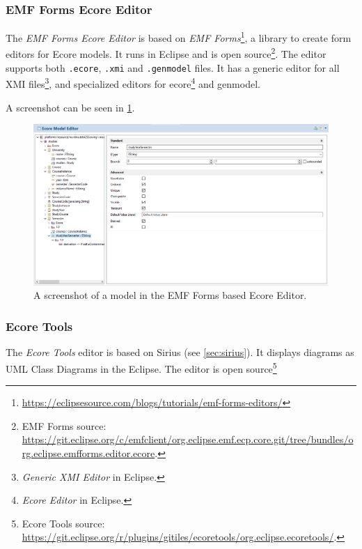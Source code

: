 \subsubsection{EMF Forms Ecore Editor} %
The \emph{EMF Forms Ecore Editor} is based on \emph{EMF Forms}\footnote{\href{https://eclipsesource.com/blogs/tutorials/emf-forms-editors/}{https://eclipsesource.com/blogs/tutorials/emf-forms-editors/}}, a library to create form editors for \gls{Ecore} models.
It runs in \gls{Eclipse} and is \gls{open source}\footnote{EMF Forms source: \href{https://git.eclipse.org/c/emfclient/org.eclipse.emf.ecp.core.git/tree/bundles/org.eclipse.emfforms.editor.ecore}{https://git.eclipse.org/c/emfclient/org.eclipse.emf.ecp.core.git/tree/bundles/org.eclipse.emfforms.editor.ecore}.}.
The editor supports both \texttt{.ecore}, \texttt{.xmi} and \texttt{.genmodel} files.
It has a generic editor for all \gls{XMI} files\footnote{\emph{Generic XMI Editor} in \gls{Eclipse}.}, and specialized editors for ecore\footnote{\emph{Ecore Editor} in \gls{Eclipse}.} and genmodel.~\cite{eclipsesourceEMFFormsEditors2016}

A screenshot can be seen in \cref{fig:emf-forms-ecore-editor}.

\begin{figure}[htbp]  %
  \centering
  \includegraphics[width=\textwidth]{figures/ecore-eclipse-emf-forms-model-editor.png}
  \caption[EMF Forms Ecore Editor]{A screenshot of a model in the EMF Forms based Ecore Editor.}\label{fig:emf-forms-ecore-editor}
\end{figure}



\subsubsection{Ecore Tools} %
The \emph{Ecore Tools} editor is based on Sirius (see \cref{sec:sirius}).
It displays diagrams as \gls{UML} Class Diagrams in the \gls{Eclipse}.
The editor is \gls{open source}\footnote{Ecore Tools source: \href{https://git.eclipse.org/r/plugins/gitiles/ecoretools/org.eclipse.ecoretools/}{https://git.eclipse.org/r/plugins/gitiles/ecoretools/org.eclipse.ecoretools/}.}

